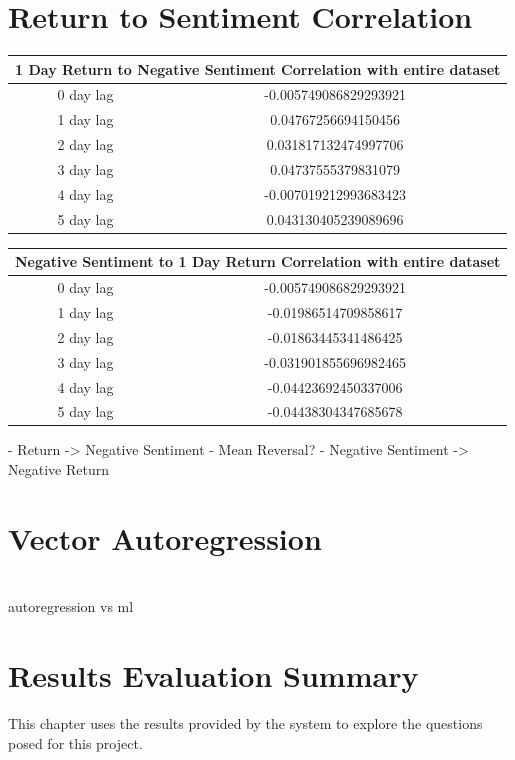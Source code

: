 \section{Return to Sentiment Correlation}

\begin{center}
\begin{tabular}{ c c }
\hline
\multicolumn{2}{|c|}{1 Day Return to Negative Sentiment Correlation with entire dataset} \\
\hline
0 day lag & -0.005749086829293921 \\
1 day lag & 0.04767256694150456 \\
2 day lag & 0.031817132474997706 \\
3 day lag & 0.04737555379831079 \\
4 day lag & -0.007019212993683423 \\
5 day lag & 0.043130405239089696
\end{tabular}
\end{center}

\begin{center}
\begin{tabular}{ c c }
\hline
\multicolumn{2}{|c|}{Negative Sentiment to 1 Day Return Correlation with entire dataset} \\
\hline
0 day lag & -0.005749086829293921 \\
1 day lag & -0.01986514709858617 \\
2 day lag & -0.01863445341486425 \\
3 day lag & -0.031901855696982465 \\
4 day lag & -0.04423692450337006 \\
5 day lag & -0.04438304347685678
\end{tabular}
\end{center}

- Return -> Negative Sentiment
    - Mean Reversal?
- Negative Sentiment -> Negative Return

\section{Vector Autoregression}

\section{}
autoregression vs ml

\section{Results Evaluation Summary}

This chapter uses the results provided by the system to explore the questions posed for this project.
